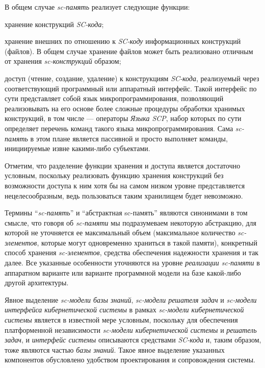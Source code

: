 В общем случае \textit{sc-память} реализует следующие функции:
\begin{textitemize}
	\item хранение конструкций \textit{SC-кода};
	\item хранение внешних по отношению к \textit{SC-коду} информационных конструкций (файлов). В общем случае хранение файлов может быть реализовано отличным от хранения \textit{sc-конструкций} образом;	
	\item доступ (чтение, создание, удаление) к конструкциям \textit{SC-кода}, реализуемый через соответствующий программный или аппаратный интерфейс. Такой интерфейс по сути представляет собой язык микропрограммирования, позволяющий реализовывать на его основе более сложные процедуры обработки хранимых конструкций, в том числе --- операторы \textit{Языка SCP}, набор которых по сути определяет перечень команд такого языка микропрограммирования. Сама \textit{sc-память} в этом плане является пассивной и просто выполняет команды, инициируемые извне какими-либо субъектами.
\end{textitemize}	

Отметим, что разделение функции хранения и доступа является достаточно условным, поскольку реализовать функцию хранения конструкций без возможности доступа к ним хотя бы на самом низком уровне представляется нецелесообразным, ведь пользоваться таким хранилищем будет невозможно.

Термины ``\textit{sc-память}'' и ``абстрактная sc-память'' являются синонимами в том смысле, что говоря об \textit{sc-памяти} мы подразумеваем некоторую абстракцию, для которой не уточняется ее максимальный объем (максимальное количество \textit{sc-элементов}, которые могут одновременно храниться в такой памяти), конкретный способ хранения \textit{sc-элементов}, средства обеспечения надежности хранения и так далее. Все указанные особенности уточняются на уровне \textit{реализации sc-памяти} в аппаратном варианте или варианте программной модели на базе какой-либо другой архитектуры.

Явное выделение \textit{sc-модели базы знаний}, \textit{sc-модели решателя задач} и \textit{sc-модели интерфейса кибернетической системы} в рамках \textit{sc-модели кибернетической системы} является в известной мере условным, поскольку для обеспечения платформенной независимости \textit{sc-модели кибернетической системы} и \textit{решатель задач}, и \textit{интерфейс системы} описываются средствами \textit{SC-кода} и, таким образом, тоже являются частью \textit{базы знаний}. Такое явное выделение указанных компонентов обусловлено удобством проектирования и сопровождения системы.


